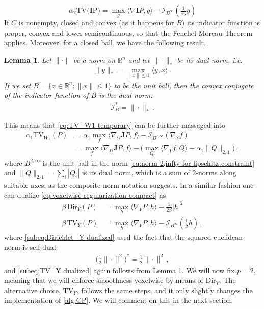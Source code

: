 \documentclass[journal,twoside,web]{ieeecolor}
\newtheorem{lemma}[theorem]{Lemma}
\newcommand{\R}{\mathbb{R}}
\begin{document}
\[ \alpha_2 \mathrm{TV({\mathbf{I}P)}} = \max_g \langle \nabla \mathbf{I}P,g \rangle - \mathcal{I}_{B^\infty}(\tfrac{1}{\alpha_2}g) \]
If $C$ is nonempty, closed and convex (as it happens for $B$) its indicator function is proper, convex and lower semicontinuous, so that the Fenchel-Moreau Theorem applies. Moreover, for a closed ball, we have the following result.
\begin{lemma} \label{lemma:conjugate of indicator}
    Let $\| \cdot \|$ be a norm on $\R^n$ and let $\| \cdot\|_*$ be its dual norm, i.e.
    \begin{align*}
        \|y\|_* = \max_{\|x\|\le1} \langle y, x \rangle \, .
    \end{align*}
    If we set $B = \{ x\in \R^n : \|x\| \le 1 \}$ to be the unit ball, then the convex conjugate of the indicator function of $B$ is the dual norm:
    \begin{align*}
        \mathcal{I}_B^* = \| \cdot\|_* \, .
    \end{align*}
\end{lemma}
This means that \eqref{eq:TV_W1 temporary} can be further massaged into
\begin{align*}
    \alpha_1\mathrm{TV}_{W_1}(P) &= \alpha_1\max_f \langle \nabla_\Omega\mathbf{J}P,f \rangle - \mathcal{I}_{B^{2,\infty}}(\nabla_Y f) \\
    &= \max_f \langle \nabla_\Omega\mathbf{J}P,f \rangle - \big( \max_Q \langle \nabla_Y f, Q \rangle - \alpha_1\|Q\|_{2,1} \big) \, ,
\end{align*}
where $B^{2,\infty}$ is the unit ball in the norm \eqref{eq:norm 2,infty for lipschitz constraint} and $\| Q \|_{2,1} = \sum_i |Q_i|$ is its dual norm, which is a sum of 2-norms along suitable axes, as the composite norm notation suggests.
In a similar fashion one can dualize \eqref{eq:voxelwise regularization compact} as
\begin{subequations}
\begin{alignat}{2}
    \label{subeq:Dirichlet_Y dualized}
    \beta\, \mathrm{Dir}_Y(P) &= \max_h \langle \nabla_Y P , h \rangle - \tfrac{1}{2\beta} |h|^2 \\
    \label{subeq:TV_Y dualized}
    \beta\, \mathrm{TV}_Y(P) &= \max_h \langle \nabla_Y P , h \rangle - \mathcal{I}_{B^\infty}(\tfrac{1}{\beta}h) \, ,
\end{alignat}
\end{subequations}
where \eqref{subeq:Dirichlet_Y dualized} used the fact that the squared euclidean norm is self-dual:
\begin{align*}
    \big(\tfrac{1}{2}\|\cdot\|^2\big)^* = \tfrac{1}{2}\|\cdot\|^2 \, ,
\end{align*}
and \eqref{subeq:TV_Y dualized} again follows from Lemma \ref{lemma:conjugate of indicator}. We will now fix $p=2$, meaning that we will enforce smoothness voxelwise by means of $\mathrm{Dir}_Y$. The alternative choice, $\mathrm{TV}_Y$, follows the same steps, and it only slightly changes the implementation of \eqref{alg:CP}. We will comment on this in the next section.
\end{document}
